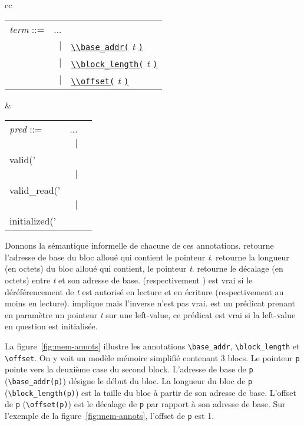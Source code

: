 \begin{center}
  \begin{tabular}{cc}
    \begin{tabular}{lrl}
      \textit{term} ::= & ... \\
      & $\mid$
      & \underline{\lstinline'\\base_addr('} \textit{t} \underline{\lstinline')'} \\
      & $\mid$
      & \underline{\lstinline'\\block_length('} \textit{t} \underline{\lstinline')'} \\
      & $\mid$
      & \underline{\lstinline'\\offset('} \textit{t} \underline{\lstinline')'} \\
    \end{tabular}
    &
    \begin{tabular}{lrl}
      \textit{pred} ::= & ... \\
      & $\mid$
      & \underline{\lstinline'\\valid('} \textit{t} \underline{\lstinline')'} \\
      & $\mid$
      & \underline{\lstinline'\\valid_read('} \textit{t} \underline{\lstinline')'} \\
      & $\mid$
      & \underline{\lstinline'\\initialized('} \textit{t} \underline{\lstinline')'} \\
    \end{tabular}
  \end{tabular}
\end{center}


Donnons la sémantique informelle de chacune de ces annotations.
\baseaddrt retourne l'adresse de base du bloc alloué qui contient le pointeur
\textit{t}.
\blocklengtht retourne la longueur (en octets) du bloc alloué qui contient, le
pointeur \textit{t}.
\offsett retourne le décalage (en octets) entre \textit{t} et son adresse de
base.
\validt (respectivement \validreadt) est vrai si le déréférencement de
\textit{t} est autorisé en lecture et en écriture (respectivement au moins en
lecture).
\validt implique \validreadt mais l'inverse n'est pas vrai.
\initializedt est un prédicat prenant en paramètre un pointeur \textit{t} sur
une left-value, ce prédicat est vrai si la left-value en question est
initialisée.





La figure~\ref{fig:mem-annots} illustre les annotations \lstinline{\base_addr},
\lstinline{\block_length} et \lstinline{\offset}.
On y voit un modèle mémoire simplifié contenant 3 blocs.
Le pointeur \lstinline'p' pointe vers la deuxième case du second block.
L'adresse de base de \lstinline'p' (\lstinline'\base_addr(p)') désigne le
début du bloc.
La longueur du bloc de \lstinline'p' (\lstinline'\block_length(p)') est la
taille du bloc à partir de son adresse de base.
L'offset de \lstinline'p' (\lstinline'\offset(p)') est le décalage de
\lstinline'p' par rapport à son adresse de base.
Sur l'exemple de la figure~\ref{fig:mem-annots}, l'offset de \lstinline'p' est
1.


